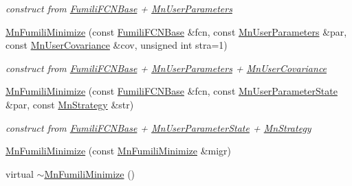 \begin{DoxyCompactItemize}
\begin{DoxyCompactList}\small\item\em construct from \mbox{\hyperlink{classROOT_1_1Minuit2_1_1FumiliFCNBase}{Fumili\+F\+C\+N\+Base}} + \mbox{\hyperlink{classROOT_1_1Minuit2_1_1MnUserParameters}{Mn\+User\+Parameters}} \end{DoxyCompactList}\item 
\mbox{\hyperlink{classROOT_1_1Minuit2_1_1MnFumiliMinimize_a3dd4f225ca0cdfdc6eb542ee32667984}{Mn\+Fumili\+Minimize}} (const \mbox{\hyperlink{classROOT_1_1Minuit2_1_1FumiliFCNBase}{Fumili\+F\+C\+N\+Base}} \&fcn, const \mbox{\hyperlink{classROOT_1_1Minuit2_1_1MnUserParameters}{Mn\+User\+Parameters}} \&par, const \mbox{\hyperlink{classROOT_1_1Minuit2_1_1MnUserCovariance}{Mn\+User\+Covariance}} \&cov, unsigned int stra=1)
\begin{DoxyCompactList}\small\item\em construct from \mbox{\hyperlink{classROOT_1_1Minuit2_1_1FumiliFCNBase}{Fumili\+F\+C\+N\+Base}} + \mbox{\hyperlink{classROOT_1_1Minuit2_1_1MnUserParameters}{Mn\+User\+Parameters}} + \mbox{\hyperlink{classROOT_1_1Minuit2_1_1MnUserCovariance}{Mn\+User\+Covariance}} \end{DoxyCompactList}\item 
\mbox{\hyperlink{classROOT_1_1Minuit2_1_1MnFumiliMinimize_ad8292150eb4f2642fb583f0cec00ed7b}{Mn\+Fumili\+Minimize}} (const \mbox{\hyperlink{classROOT_1_1Minuit2_1_1FumiliFCNBase}{Fumili\+F\+C\+N\+Base}} \&fcn, const \mbox{\hyperlink{classROOT_1_1Minuit2_1_1MnUserParameterState}{Mn\+User\+Parameter\+State}} \&par, const \mbox{\hyperlink{classROOT_1_1Minuit2_1_1MnStrategy}{Mn\+Strategy}} \&str)
\begin{DoxyCompactList}\small\item\em construct from \mbox{\hyperlink{classROOT_1_1Minuit2_1_1FumiliFCNBase}{Fumili\+F\+C\+N\+Base}} + \mbox{\hyperlink{classROOT_1_1Minuit2_1_1MnUserParameterState}{Mn\+User\+Parameter\+State}} + \mbox{\hyperlink{classROOT_1_1Minuit2_1_1MnStrategy}{Mn\+Strategy}} \end{DoxyCompactList}\item 
\mbox{\hyperlink{classROOT_1_1Minuit2_1_1MnFumiliMinimize_a082eb87753b71a4d383ff8d735dc8410}{Mn\+Fumili\+Minimize}} (const \mbox{\hyperlink{classROOT_1_1Minuit2_1_1MnFumiliMinimize}{Mn\+Fumili\+Minimize}} \&migr)
\item 
virtual \mbox{\hyperlink{classROOT_1_1Minuit2_1_1MnFumiliMinimize_ab999713e15397b9373551207f05786c5}{$\sim$\+Mn\+Fumili\+Minimize}} ()
\item 

\end{DoxyCompactItemize}
